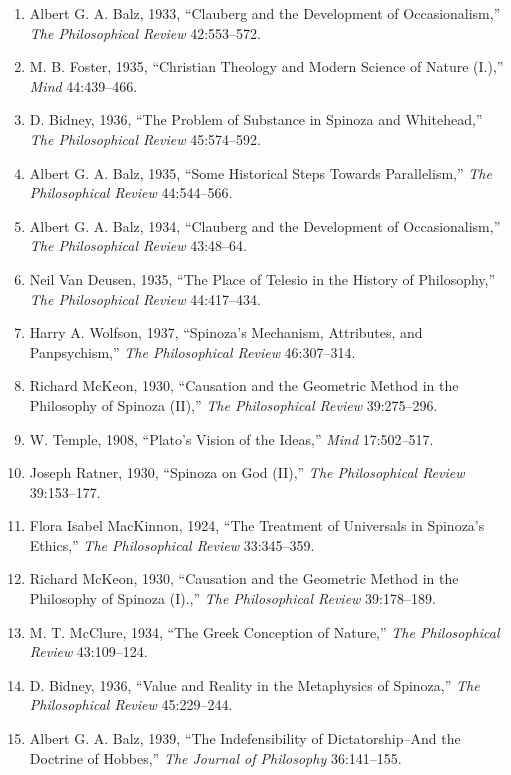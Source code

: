 \documentclass[
]{article}
\begin{document}
\begin{enumerate}
\def\labelenumi{\arabic{enumi}.}
\item
  Albert G. A. Balz, 1933, ``Clauberg and the Development of
  Occasionalism,'' \emph{The Philosophical Review} 42:553--572.
\item
  M. B. Foster, 1935, ``Christian Theology and Modern Science of Nature
  (I.),'' \emph{Mind} 44:439--466.
\item
  D. Bidney, 1936, ``The Problem of Substance in Spinoza and
  Whitehead,'' \emph{The Philosophical Review} 45:574--592.
\item
  Albert G. A. Balz, 1935, ``Some Historical Steps Towards
  Parallelism,'' \emph{The Philosophical Review} 44:544--566.
\item
  Albert G. A. Balz, 1934, ``Clauberg and the Development of
  Occasionalism,'' \emph{The Philosophical Review} 43:48--64.
\item
  Neil Van Deusen, 1935, ``The Place of Telesio in the History of
  Philosophy,'' \emph{The Philosophical Review} 44:417--434.
\item
  Harry A. Wolfson, 1937, ``Spinoza's Mechanism, Attributes, and
  Panpsychism,'' \emph{The Philosophical Review} 46:307--314.
\item
  Richard McKeon, 1930, ``Causation and the Geometric Method in the
  Philosophy of Spinoza (II),'' \emph{The Philosophical Review}
  39:275--296.
\item
  W. Temple, 1908, ``Plato's Vision of the Ideas,'' \emph{Mind}
  17:502--517.
\item
  Joseph Ratner, 1930, ``Spinoza on God (II),'' \emph{The Philosophical
  Review} 39:153--177.
\item
  Flora Isabel MacKinnon, 1924, ``The Treatment of Universals in
  Spinoza's Ethics,'' \emph{The Philosophical Review} 33:345--359.
\item
  Richard McKeon, 1930, ``Causation and the Geometric Method in the
  Philosophy of Spinoza (I).,'' \emph{The Philosophical Review}
  39:178--189.
\item
  M. T. McClure, 1934, ``The Greek Conception of Nature,'' \emph{The
  Philosophical Review} 43:109--124.
\item
  D. Bidney, 1936, ``Value and Reality in the Metaphysics of Spinoza,''
  \emph{The Philosophical Review} 45:229--244.
\item
  Albert G. A. Balz, 1939, ``The Indefensibility of Dictatorship--And
  the Doctrine of Hobbes,'' \emph{The Journal of Philosophy}
  36:141--155.
\end{enumerate}
\end{document}
